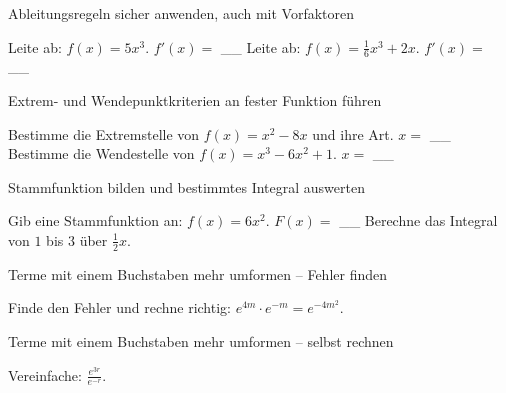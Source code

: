 \begin{aufgabe}{Ableitungsregeln sicher anwenden, auch mit Vorfaktoren}
\begin{teile}
\teil Leite ab: $f(x) = 5x^3$. $f'(x) =$ \_\_
\teil Leite ab: $f(x) = \frac{1}{6}x^3 + 2x$. $f'(x) =$ \_\_
\end{teile}
\end{aufgabe}

\begin{aufgabe}{Extrem- und Wendepunktkriterien an fester Funktion führen}
\begin{teile}
\teil Bestimme die Extremstelle von $f(x) = x^2 - 8x$ und ihre Art. $x =$ \_\_
\teil Bestimme die Wendestelle von $f(x) = x^3 - 6x^2 + 1$. $x =$ \_\_
\end{teile}
\end{aufgabe}

\begin{aufgabe}{Stammfunktion bilden und bestimmtes Integral auswerten}
\begin{teile}
\teil Gib eine Stammfunktion an: $f(x) = 6x^2$. $F(x) =$ \_\_
\teil Berechne das Integral von $1$ bis $3$ über $\frac{1}{2}x$. \leerfeld
\end{teile}
\end{aufgabe}

\begin{aufgabe}{Terme mit einem Buchstaben mehr umformen – Fehler finden}
\begin{teile}
\teil Finde den Fehler und rechne richtig: $e^{4m} \cdot e^{-m} = e^{-4m^2}$.
\end{teile}
\end{aufgabe}

\begin{aufgabe}{Terme mit einem Buchstaben mehr umformen – selbst rechnen}
\begin{teile}
\teil Vereinfache: $\frac{e^{3r}}{e^{-r}}$. \leerfeld
\end{teile}
\end{aufgabe}
